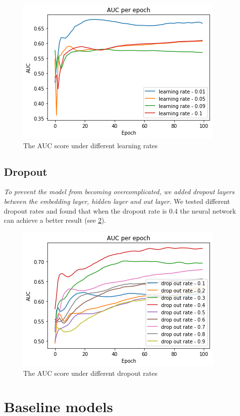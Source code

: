 \documentclass[11pt,twoside]{report}
\begin{document}
\begin{figure}[H]
    \centering
    \includegraphics[scale=0.9]{auc_learning_rate.png}
    \caption{The AUC score under different learning rates}
    \label{fig:auc_learning_rate}
\end{figure}

\subsection{Dropout}
\textit{To prevent the model from becoming overcomplicated, we added dropout layers between the embedding layer, hidden layer and out layer.} We tested different dropout rates and found that when the dropout rate is 0.4 the neural network can achieve a better result (see \ref{fig:auc_drop_out_rate}).

\begin{figure}[H]
    \centering
    \includegraphics[scale=0.9]{auc_drop_out_rate.png}
    \caption{The AUC score under different dropout rates}
    \label{fig:auc_drop_out_rate}
\end{figure}

\section{Baseline models}
\end{document}
